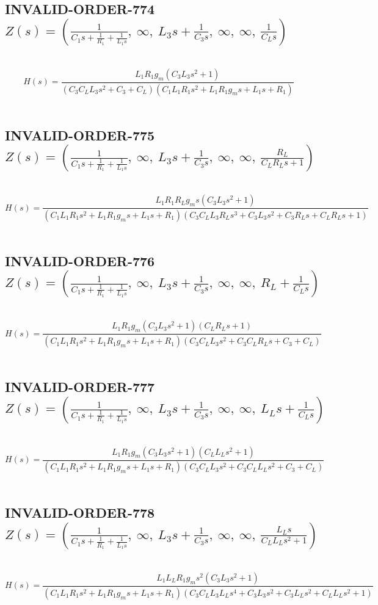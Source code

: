 \documentclass{article}
\begin{document}
\subsection{INVALID-ORDER-774 $Z(s) = \left( \frac{1}{C_{1} s + \frac{1}{R_{1}} + \frac{1}{L_{1} s}}, \  \infty, \  L_{3} s + \frac{1}{C_{3} s}, \  \infty, \  \infty, \  \frac{1}{C_{L} s}\right)$ } \ 
\textbf{\[H(s) = \frac{L_{1} R_{1} g_{m} \left(C_{3} L_{3} s^{2} + 1\right)}{\left(C_{3} C_{L} L_{3} s^{2} + C_{3} + C_{L}\right) \left(C_{1} L_{1} R_{1} s^{2} + L_{1} R_{1} g_{m} s + L_{1} s + R_{1}\right)}\] } \ 
\subsection{INVALID-ORDER-775 $Z(s) = \left( \frac{1}{C_{1} s + \frac{1}{R_{1}} + \frac{1}{L_{1} s}}, \  \infty, \  L_{3} s + \frac{1}{C_{3} s}, \  \infty, \  \infty, \  \frac{R_{L}}{C_{L} R_{L} s + 1}\right)$ } \ 
\textbf{\[H(s) = \frac{L_{1} R_{1} R_{L} g_{m} s \left(C_{3} L_{3} s^{2} + 1\right)}{\left(C_{1} L_{1} R_{1} s^{2} + L_{1} R_{1} g_{m} s + L_{1} s + R_{1}\right) \left(C_{3} C_{L} L_{3} R_{L} s^{3} + C_{3} L_{3} s^{2} + C_{3} R_{L} s + C_{L} R_{L} s + 1\right)}\] } \ 
\subsection{INVALID-ORDER-776 $Z(s) = \left( \frac{1}{C_{1} s + \frac{1}{R_{1}} + \frac{1}{L_{1} s}}, \  \infty, \  L_{3} s + \frac{1}{C_{3} s}, \  \infty, \  \infty, \  R_{L} + \frac{1}{C_{L} s}\right)$ } \ 
\textbf{\[H(s) = \frac{L_{1} R_{1} g_{m} \left(C_{3} L_{3} s^{2} + 1\right) \left(C_{L} R_{L} s + 1\right)}{\left(C_{1} L_{1} R_{1} s^{2} + L_{1} R_{1} g_{m} s + L_{1} s + R_{1}\right) \left(C_{3} C_{L} L_{3} s^{2} + C_{3} C_{L} R_{L} s + C_{3} + C_{L}\right)}\] } \ 
\subsection{INVALID-ORDER-777 $Z(s) = \left( \frac{1}{C_{1} s + \frac{1}{R_{1}} + \frac{1}{L_{1} s}}, \  \infty, \  L_{3} s + \frac{1}{C_{3} s}, \  \infty, \  \infty, \  L_{L} s + \frac{1}{C_{L} s}\right)$ } \ 
\textbf{\[H(s) = \frac{L_{1} R_{1} g_{m} \left(C_{3} L_{3} s^{2} + 1\right) \left(C_{L} L_{L} s^{2} + 1\right)}{\left(C_{1} L_{1} R_{1} s^{2} + L_{1} R_{1} g_{m} s + L_{1} s + R_{1}\right) \left(C_{3} C_{L} L_{3} s^{2} + C_{3} C_{L} L_{L} s^{2} + C_{3} + C_{L}\right)}\] } \ 
\subsection{INVALID-ORDER-778 $Z(s) = \left( \frac{1}{C_{1} s + \frac{1}{R_{1}} + \frac{1}{L_{1} s}}, \  \infty, \  L_{3} s + \frac{1}{C_{3} s}, \  \infty, \  \infty, \  \frac{L_{L} s}{C_{L} L_{L} s^{2} + 1}\right)$ } \ 
\textbf{\[H(s) = \frac{L_{1} L_{L} R_{1} g_{m} s^{2} \left(C_{3} L_{3} s^{2} + 1\right)}{\left(C_{1} L_{1} R_{1} s^{2} + L_{1} R_{1} g_{m} s + L_{1} s + R_{1}\right) \left(C_{3} C_{L} L_{3} L_{L} s^{4} + C_{3} L_{3} s^{2} + C_{3} L_{L} s^{2} + C_{L} L_{L} s^{2} + 1\right)}\] } \ 
\end{document}
